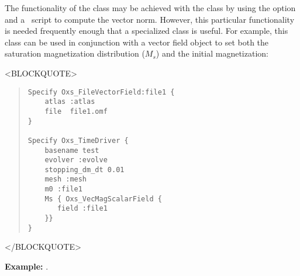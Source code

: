 \begin{description}
The functionality of the  class may be achieved
with the  class by using the
 option and a \Tcl\ script to compute the vector
norm.  However, this particular functionality is needed frequently
enough that a specialized class is useful.  For example, this class can
be used in conjunction with a vector field object to set
both the saturation magnetization distribution ($M_s$) and the initial
magnetization:
\begin{rawhtml}<BLOCKQUOTE>\end{rawhtml}
\begin{quote}
\begin{verbatim}
Specify Oxs_FileVectorField:file1 {
    atlas :atlas
    file  file1.omf
}

Specify Oxs_TimeDriver {
    basename test
    evolver :evolve
    stopping_dm_dt 0.01
    mesh :mesh
    m0 :file1
    Ms { Oxs_VecMagScalarField {
       field :file1
    }}
}\end{verbatim}
\end{quote}
\begin{rawhtml}</BLOCKQUOTE>\end{rawhtml}

\textbf{Example:} .


\end{description}
